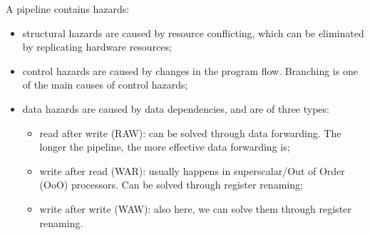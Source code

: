 A pipeline contains hazards:
\begin{itemize}
    \item structural hazards are caused by resource conflicting, which can be eliminated by replicating hardware resources;
    \item control hazards are caused by changes in the program flow. Branching is one of the main causes of control hazards;
    \item data hazards are caused by data dependencies, and are of three types:
    \begin{itemize}
        \item read after write (RAW): can be solved through data forwarding. The longer the pipeline, the more effective data forwarding is;
        \item write after read (WAR): usually happens in superscalar/Out of Order (OoO) processors. Can be solved through register renaming;
        \item write after write (WAW): also here, we can solve them through register renaming.
    \end{itemize}
\end{itemize} 

